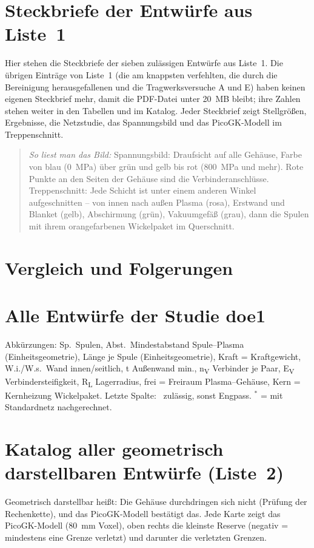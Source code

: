 \documentclass[10pt,a4paper]{article}
\newcommand{\lesehilfe}[1]{\begin{quote}\small\textit{So liest man das Bild:} #1\end{quote}}
\begin{document}
\section{Steckbriefe der Entwürfe aus Liste~1}\label{sec:steckbriefe}
Hier stehen die Steckbriefe der sieben zulässigen Entwürfe aus Liste~1. Die übrigen Einträge von Liste~1 (die am
knappsten verfehlten, die durch die Bereinigung herausgefallenen und die Tragwerksversuche A und E) haben keinen
eigenen Steckbrief mehr, damit die PDF-Datei unter 20~MB bleibt; ihre Zahlen stehen weiter in den Tabellen und im
Katalog. Jeder Steckbrief zeigt Stellgrößen, Ergebnisse, die Netzstudie,
das Spannungsbild und das PicoGK-Modell im Treppenschnitt.
\lesehilfe{Spannungsbild: Draufsicht auf alle Gehäuse, Farbe von blau (\SI{0}{MPa}) über grün und gelb bis rot
(\SI{800}{MPa} und mehr). Rote Punkte an den Seiten der Gehäuse sind die Verbinderanschlüsse. Treppenschnitt: Jede
Schicht ist unter einem anderen Winkel aufgeschnitten -- von innen nach außen Plasma (rosa), Erstwand und Blanket
(gelb), Abschirmung (grün), Vakuumgefäß (grau), dann die Spulen mit ihrem orangefarbenen Wickelpaket im Querschnitt.}



\section{Vergleich und Folgerungen}\label{sec:vergleich}


\appendix
\section{Alle Entwürfe der Studie doe1}\label{anh:alle}
Abkürzungen: Sp.\ Spulen, Abst.\ Mindestabstand Spule--Plasma (Einheitsgeometrie), Länge je Spule
(Einheitsgeometrie), Kraft = Kraftgewicht, W.i./W.s.\ Wand innen/seitlich, t Außenwand min., n\textsubscript{V}
Verbinder je Paar, E\textsubscript{V} Verbindersteifigkeit, R\textsubscript{L} Lagerradius, frei = Freiraum
Plasma--Gehäuse, Kern = Kernheizung Wickelpaket. Letzte Spalte: \checkmark\ zulässig, sonst Engpass. $^\ast$ = mit
Standardnetz nachgerechnet.


\section{Katalog aller geometrisch darstellbaren Entwürfe (Liste~2)}\label{anh:katalog}
Geometrisch darstellbar heißt: Die Gehäuse durchdringen sich nicht (Prüfung der Rechenkette), und das PicoGK-Modell
bestätigt das. Jede Karte zeigt das PicoGK-Modell (\SI{80}{mm} Voxel), oben rechts die kleinste Reserve (negativ =
mindestens eine Grenze verletzt) und darunter die verletzten Grenzen.
\clearpage

\end{document}
